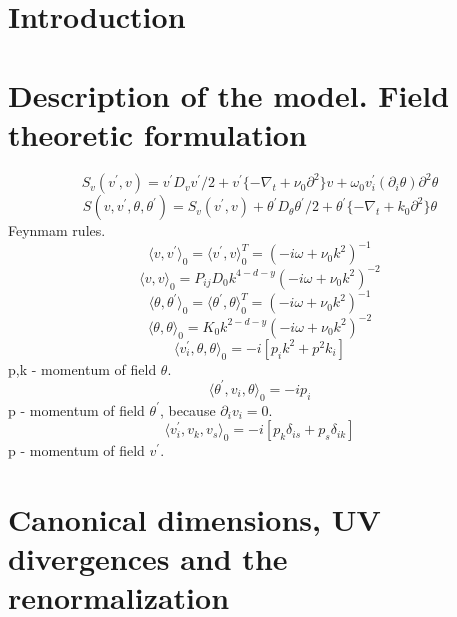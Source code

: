 \documentclass[12pt]{article}
\begin{document}
\section{Introduction} 
\label{sec:Intro}

\section{Description of the model. Field theoretic formulation}
\label{sec:QFT}
\begin{equation}
S_{v}(v^{'},v)=v^{'}D_{v}v^{'}/2+v^{'}\{-\nabla_{t}+\nu_{0}\partial^2\}v+\omega_{0}v^{'}_{i}(\partial_{i}\theta)\partial^{2}\theta
\end{equation}
\begin{equation}
S(v,v^{'},\theta,\theta^{'}) = S_{v}(v^{'},v)+\theta^{'}D_{\theta}\theta^{'}/2+\theta^{'}\{-\nabla_{t}+k_{0}\partial^{2}\}\theta
\end{equation}
Feynmam rules.
\begin{equation}
\langle v,v^{'} \rangle_{0}=\langle v^{'},v \rangle _{0}^{T}=(-i\omega+\nu_{0}k^2)^{-1}
\end{equation}
\begin{equation}
\langle v,v \rangle_{0}=P_{ij}D_{0}k^{4-d-y}(-i\omega+\nu_{0}k^2)^{-2}
\end{equation}
\begin{equation}
\langle \theta,\theta^{'} \rangle_{0}=\langle \theta^{'},\theta \rangle _{0}^{T}=(-i\omega+\nu_{0}k^2)^{-1}
\end{equation}
\begin{equation}
\langle \theta,\theta \rangle_{0}=K_{0}k^{2-d-y}(-i\omega+\nu_{0}k^2)^{-2}
\end{equation}
\begin{equation}
\langle v_{i}^{'}, \theta,\theta \rangle_{0}= -i[p_i k^2+p^2 k_i]
\end{equation}
p,k - momentum of field $\theta$.
\begin{equation}
\langle \theta^{'}, v_i ,\theta \rangle_{0}= -ip_i
\end{equation}
p - momentum of field $\theta^{'}$, because $\partial_i v_i=0$.
\begin{equation}
\langle v^{'}_i, v_k ,v_s \rangle_{0}= -i[p_k \delta_{is}+ p_s \delta_{ik}]
\end{equation}
p - momentum of field $v^{'}$.
\section{Canonical dimensions, UV divergences and the renormalization}
\label{sec:Reno}
\end{document}
